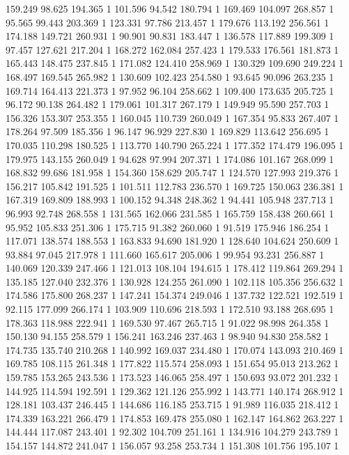 	159.249	98.625	194.365	1
	101.596	94.542	180.794	1
	169.469	104.097	268.857	1
	95.565	99.443	203.369	1
	123.331	97.786	213.457	1
	179.676	113.192	256.561	1
	174.188	149.721	260.931	1
	90.901	90.831	183.447	1
	136.578	117.889	199.309	1
	97.457	127.621	217.204	1
	168.272	162.084	257.423	1
	179.533	176.561	181.873	1
	165.443	148.475	237.845	1
	171.082	124.410	258.969	1
	130.329	109.690	249.224	1
	168.497	169.545	265.982	1
	130.609	102.423	254.580	1
	93.645	90.096	263.235	1
	169.714	164.413	221.373	1
	97.952	96.104	258.662	1
	109.400	173.635	205.725	1
	96.172	90.138	264.482	1
	179.061	101.317	267.179	1
	149.949	95.590	257.703	1
	156.326	153.307	253.355	1
	160.045	110.739	260.049	1
	167.354	95.833	267.407	1
	178.264	97.509	185.356	1
	96.147	96.929	227.830	1
	169.829	113.642	256.695	1
	170.035	110.298	180.525	1
	113.770	140.790	265.224	1
	177.352	174.479	196.095	1
	179.975	143.155	260.049	1
	94.628	97.994	207.371	1
	174.086	101.167	268.099	1
	168.832	99.686	181.958	1
	154.360	158.629	205.747	1
	124.570	127.993	219.376	1
	156.217	105.842	191.525	1
	101.511	112.783	236.570	1
	169.725	150.063	236.381	1
	167.319	169.809	188.993	1
	100.152	94.348	248.362	1
	94.441	105.948	237.713	1
	96.993	92.748	268.558	1
	131.565	162.066	231.585	1
	165.759	158.438	260.661	1
	95.952	105.833	251.306	1
	175.715	91.382	260.060	1
	91.519	175.946	186.254	1
	117.071	138.574	188.553	1
	163.833	94.690	181.920	1
	128.640	104.624	250.609	1
	93.884	97.045	217.978	1
	111.660	165.617	205.006	1
	99.954	93.231	256.887	1
	140.069	120.339	247.466	1
	121.013	108.104	194.615	1
	178.412	119.864	269.294	1
	135.185	127.040	232.376	1
	130.928	124.255	261.090	1
	102.118	105.356	256.632	1
	174.586	175.800	268.237	1
	147.241	154.374	249.046	1
	137.732	122.521	192.519	1
	92.115	177.099	266.174	1
	103.909	110.696	218.593	1
	172.510	93.188	268.695	1
	178.363	118.988	222.941	1
	169.530	97.467	265.715	1
	91.022	98.998	264.358	1
	150.130	94.155	258.579	1
	156.241	163.246	237.463	1
	98.940	94.830	258.582	1
	174.735	135.740	210.268	1
	140.992	169.037	234.480	1
	170.074	143.093	210.469	1
	169.785	108.115	261.348	1
	177.822	115.574	258.093	1
	151.654	95.013	213.262	1
	159.785	153.265	243.536	1
	173.523	146.065	258.497	1
	150.693	93.072	201.232	1
	144.925	114.594	192.591	1
	129.362	121.126	255.992	1
	143.771	140.174	268.912	1
	128.181	103.437	246.445	1
	144.686	116.185	253.715	1
	91.989	116.035	218.412	1
	174.339	163.221	266.479	1
	174.853	169.478	255.080	1
	162.147	164.862	263.227	1
	144.444	117.087	243.401	1
	92.302	104.709	251.161	1
	134.916	104.279	243.789	1
	154.157	144.872	241.047	1
	156.057	93.258	253.734	1
	151.308	101.756	195.107	1
